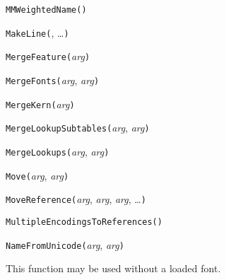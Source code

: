 \texttt{MMWeightedName(}\texttt{)}



\texttt{MakeLine(}, \ldots\texttt{)}



\texttt{MergeFeature(}\textit{arg}\texttt{)}



\texttt{MergeFonts(}\textit{arg}, \textit{arg}\texttt{)}



\texttt{MergeKern(}\textit{arg}\texttt{)}



\texttt{MergeLookupSubtables(}\textit{arg}, \textit{arg}\texttt{)}



\texttt{MergeLookups(}\textit{arg}, \textit{arg}\texttt{)}



\texttt{Move(}\textit{arg}, \textit{arg}\texttt{)}



\texttt{MoveReference(}\textit{arg}, \textit{arg}, \textit{arg}, \ldots\texttt{)}



\texttt{MultipleEncodingsToReferences(}\texttt{)}



\texttt{NameFromUnicode(}\textit{arg}, \textit{arg}\texttt{)}

This function may be used without a loaded font.


